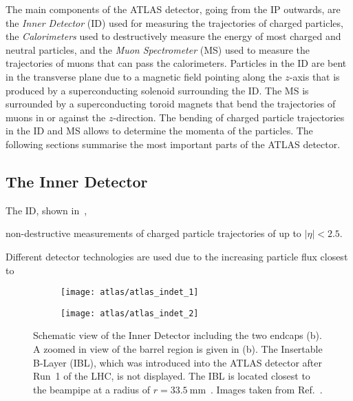 The main components of the ATLAS detector, going from the IP outwards, are the
\emph{Inner Detector} (ID) used for measuring the trajectories of charged
particles, the \emph{Calorimeters} used to destructively measure the energy of
most charged and neutral particles, and the \emph{Muon Spectrometer} (MS) used
to measure the trajectories of muons that can pass the calorimeters. Particles
in the ID are bent in the transverse plane due to a magnetic field pointing
along the $z$-axis that is produced by a superconducting solenoid surrounding
the ID.  The MS is surrounded by a superconducting toroid magnets that bend the
trajectories of muons in or against the $z$-direction. The bending of charged
particle trajectories in the ID and MS allows to determine the momenta of the
particles. The following sections summarise the most important parts of the
ATLAS detector.


\subsection{The Inner Detector}

The ID, shown in~,

non-destructive measurements of charged particle trajectories of up to
$|\eta| < 2.5$.

Different detector technologies are used due to the increasing particle flux closest to

\begin{figure}[htbp]

  \begin{subfigure}[b]{0.55\textwidth}
    \texttt{[image: atlas/atlas\_indet\_1]}%
    \subcaption{}
  \end{subfigure}\hfill%
  \begin{subfigure}[b]{0.45\textwidth}
    \texttt{[image: atlas/atlas\_indet\_2]}%
    \subcaption{}
  \end{subfigure}

  \caption{Schematic view of the Inner Detector including the two endcaps (b). A
    zoomed in view of the barrel region is given in (b). The Insertable B-Layer
    (IBL), which was introduced into the ATLAS detector after Run~1 of the LHC,
    is not displayed. The IBL is located closest to the beampipe at a radius of
    $r = \SI{33.5}{\milli\metre}$~\cite{PIX-2018-001}. Images taken from
    Ref.~\cite{Pequenao:1095926}.}%
  \label{fig:atlas_inner_detector}
\end{figure}


